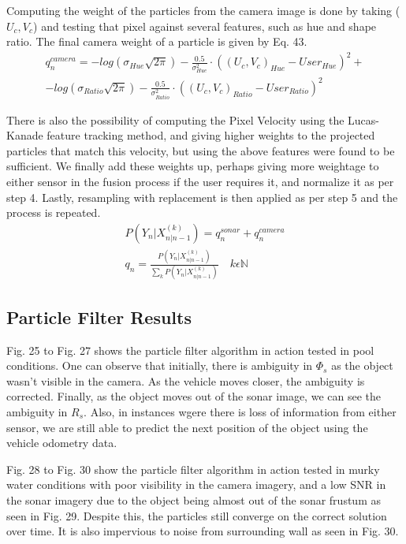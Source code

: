 \documentclass[a4paper]{IEEEtran}
\let\Phi\varPhi
\newcommand{\RSonar}{$\si{\textit{R}_{s}}$\xspace}
\newcommand{\PhiSonar}{$\si{\Phi_{s}}$\xspace}
\begin{document}
Computing the weight of the particles from the camera image is done by taking ($U_{c}, V_{c}$) and testing that pixel against several features, such as hue and shape ratio. The final camera weight of a particle is given by Eq. 43.
\begingroup\makeatletter\def\f@size{7}\check@mathfonts
\begin{gather}
q_{n}^{camera}=-log(\sigma_{Hue}\sqrt{2\pi})-\frac{0.5}{\sigma_{Hue}^{2}}\cdot((U_{c},V_{c})_{Hue}-User_{Hue})^{2}+ \nonumber\\
-log(\sigma_{Ratio}\sqrt{2\pi})-\frac{0.5}{\sigma_{Ratio}^{2}}\cdot((U_{c},V_{c})_{Ratio}-User_{Ratio})^{2}
\end{gather}
\endgroup 

There is also the possibility of computing the Pixel Velocity using the Lucas-Kanade feature tracking method, and giving higher weights to the projected particles that match this velocity, but using the above features were found to be sufficient. We finally add these weights up, perhaps giving more weightage to either sensor in the fusion process if the user requires it, and normalize it as per step 4. Lastly, resampling with replacement is then applied as per step 5 and the process is repeated.
\begingroup\makeatletter\def\f@size{7}\check@mathfonts
\begin{gather}
P(Y_{n}|X_{n|n-1}^{(k)})=q_{n}^{sonar}+q_{n}^{camera} \\
q_{n}=\frac{P(Y_{n}|X_{n|n-1}^{(k)})}{\sum_{k}P(Y_{n}|X_{n|n-1}^{(k)})}\quad k\epsilon\mathbb{N}
\end{gather}
\endgroup 

\subsection{Particle Filter Results}

Fig. 25 to Fig. 27 shows the particle filter algorithm in action tested in pool conditions. One can observe that initially, there is ambiguity in \PhiSonar as the object wasn't visible in the camera. As the vehicle moves closer, the ambiguity is corrected. Finally, as the object moves out of the sonar image, we can see the ambiguity in \RSonar. Also, in instances wgere there is loss of information from either sensor, we are still able to predict the next position of the object using the vehicle odometry data.

Fig. 28 to Fig. 30 show the particle filter algorithm in action tested in murky water conditions with poor visibility in the camera imagery, and a low SNR in the sonar imagery due to the object being almost out of the sonar frustum as seen in Fig. 29. Despite this, the particles still converge on the correct solution over time. It is also impervious to noise from surrounding wall as seen in Fig. 30. 
\end{document}
